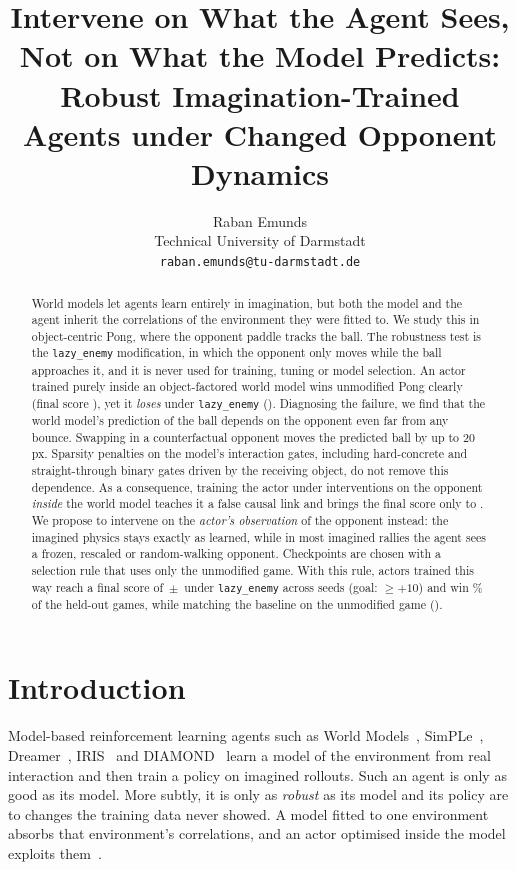 \documentclass{article}
\title{Intervene on What the Agent Sees, Not on What the Model Predicts:\\
Robust Imagination-Trained Agents under Changed Opponent Dynamics}
\author{%
  Raban Emunds \\
  Technical University of Darmstadt\\
  \texttt{raban.emunds@tu-darmstadt.de}
}
\newcommand{\lazy}{\texttt{lazy\_enemy}}
\begin{document}
\maketitle

\begin{abstract}
World models let agents learn entirely in imagination, but both the model and the agent inherit the
correlations of the environment they were fitted to. We study this in object-centric Pong, where the
opponent paddle tracks the ball. The robustness test is the \lazy{} modification, in which the
opponent only moves while the ball approaches it, and it is never used for training, tuning or model
selection. An actor trained purely inside an object-factored world model wins unmodified Pong
clearly (final score \BasePong{}), yet it \emph{loses} under \lazy{} (\BaseLazy{}). Diagnosing the failure, we find
that the world model's prediction of the ball depends on the opponent even far from any bounce.
Swapping in a counterfactual opponent moves the predicted ball by up to 20\,px. Sparsity penalties on the
model's interaction gates, including hard-concrete and straight-through binary gates driven by the
receiving object, do not remove this dependence. As a consequence, training the actor under
interventions on the opponent \emph{inside} the world model teaches it a false causal link and
brings the final score only to \DynLazy{}. We propose to intervene on the \emph{actor's observation}
of the opponent instead: the imagined physics stays exactly as learned, while in most imagined rallies
the agent sees a frozen, rescaled or random-walking opponent. Checkpoints are chosen with a selection
rule that uses only the unmodified game. With this rule, actors trained this way reach a final score of
\OursLazy{}\,$\pm$\,\OursLazyStd{} under \lazy{} across \OursSeeds{} seeds (goal: $\geq +10$) and
win \OursWon\% of the held-out games, while matching the baseline on the unmodified game
(\OursPong{}).
\end{abstract}

\section{Introduction}
\label{sec:intro}

Model-based reinforcement learning agents such as World Models~\cite{ha2018world},
SimPLe~\cite{kaiser2020simple}, Dreamer~\cite{hafner2020dreamer,hafner2023dreamerv3},
IRIS~\cite{micheli2023iris} and DIAMOND~\cite{alonso2024diamond} learn a model of the environment
from real interaction and then train a policy on imagined rollouts. Such an agent is only as good as
its model. More subtly, it is only as \emph{robust} as its model and its policy are to changes the
training data never showed. A model fitted to one environment absorbs that environment's
correlations, and an actor optimised inside the model exploits them~\cite{geirhos2020shortcut,dehaan2019causal}.
\end{document}
